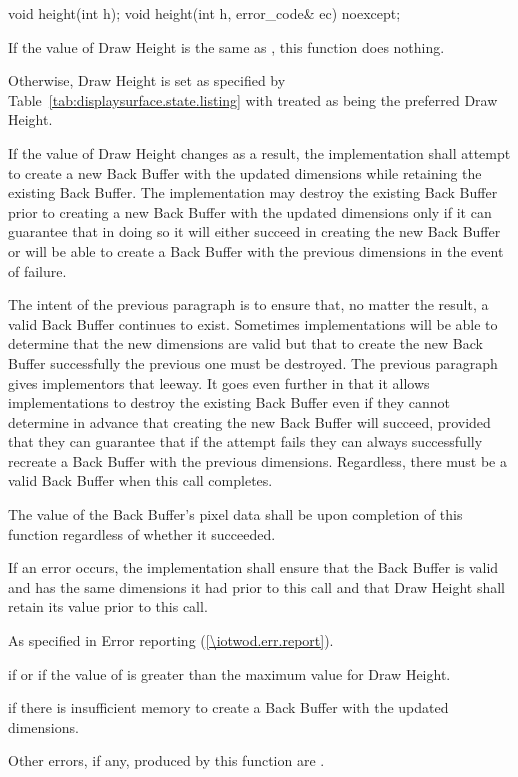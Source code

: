\begin{itemdecl}
void height(int h);
void height(int h, error_code& ec) noexcept;
\end{itemdecl}
\begin{itemdescr}
\pnum
\effects
If the value of Draw Height is the same as , this function does nothing.

\pnum
Otherwise, Draw Height is set as specified by Table~\ref{tab:displaysurface.state.listing} with  treated as being the preferred Draw Height.

\pnum
If the value of Draw Height changes as a result, the implementation shall attempt to create a new Back Buffer with the updated dimensions while retaining the existing Back Buffer. The implementation may destroy the existing Back Buffer prior to creating a new Back Buffer with the updated dimensions only if it can guarantee that in doing so it will either succeed in creating the new Back Buffer or will be able to create a Back Buffer with the previous dimensions in the event of failure.

\pnum
\begin{note}
The intent of the previous paragraph is to ensure that, no matter the result, a valid Back Buffer continues to exist. Sometimes implementations will be able to determine that the new dimensions are valid but that to create the new Back Buffer successfully the previous one must be destroyed. The previous paragraph gives implementors that leeway. It goes even further in that it allows implementations to destroy the existing Back Buffer even if they cannot determine in advance that creating the new Back Buffer will succeed, provided that they can guarantee that if the attempt fails they can always successfully recreate a Back Buffer with the previous dimensions. Regardless, there must be a valid Back Buffer when this call completes.
\end{note}

\pnum
The value of the Back Buffer's pixel data shall be \unspecnorm upon completion of this function regardless of whether it succeeded.

\pnum
If an error occurs, the implementation shall ensure that the Back Buffer is valid and has the same dimensions it had prior to this call and that Draw Height shall retain its value prior to this call.

\pnum
\throws
As specified in Error reporting (\ref{\iotwod.err.report}).

\pnum
\errors
{} if  or if the value of  is greater than the maximum value for Draw Height.

 if there is insufficient memory to create a Back Buffer with the updated dimensions.

Other errors, if any, produced by this function are .
\end{itemdescr}

